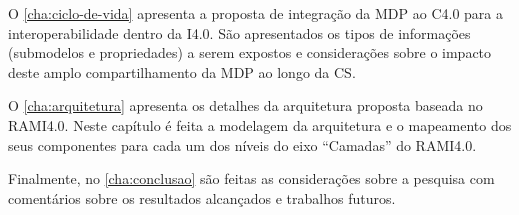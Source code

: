 O \autoref{cha:ciclo-de-vida} apresenta a proposta de integração da MDP ao C4.0 para a interoperabilidade dentro da I4.0. São apresentados os tipos de informações (submodelos e propriedades) a serem expostos e considerações sobre o impacto deste amplo compartilhamento da MDP ao longo da CS.

O \autoref{cha:arquitetura} apresenta os detalhes da arquitetura proposta baseada no RAMI4.0. Neste capítulo é feita a modelagem da arquitetura e o mapeamento dos seus componentes para cada um dos níveis do eixo ``Camadas'' do RAMI4.0.

Finalmente, no \autoref{cha:conclusao} são feitas as considerações sobre a pesquisa com comentários sobre os resultados alcançados e trabalhos futuros.
